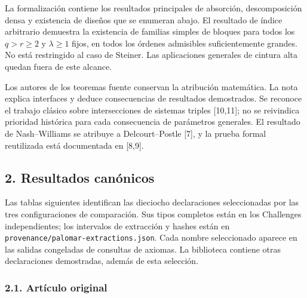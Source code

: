 \documentclass[spanish,11pt,a4paper]{article}
\begin{document}
La formalización contiene los resultados principales de absorción, descomposición densa y existencia de diseños que se enumeran abajo. El resultado de índice arbitrario demuestra la existencia de familias simples de bloques para todos los \(q>r\ge2\) y \(\lambda\ge1\) fijos, en todos los órdenes admisibles suficientemente grandes. No está restringido al caso de Steiner. Las aplicaciones generales de cintura alta quedan fuera de este alcance.

Los autores de los teoremas fuente conservan la atribución matemática. La nota explica interfaces y deduce consecuencias de resultados demostrados. Se reconoce el trabajo clásico sobre intersecciones de sistemas triples {[}10,11{]}; no se reivindica prioridad histórica para cada consecuencia de parámetros generales. El resultado de Nash--Williams se atribuye a Delcourt--Postle {[}7{]}, y la prueba formal reutilizada está documentada en {[}8,9{]}.

\subsection{2. Resultados canónicos}\label{resultados-canuxf3nicos}

Las tablas siguientes identifican las dieciocho declaraciones seleccionadas por las tres configuraciones de comparación. Sus tipos completos están en los Challenges independientes; los intervalos de extracción y hashes están en \texttt{provenance/\allowbreak{}palomar-extractions.\allowbreak{}json}. Cada nombre seleccionado aparece en las salidas congeladas de consultas de axiomas. La biblioteca contiene otras declaraciones demostradas, además de esta selección.


\subsubsection{2.1. Artículo original}\label{artuxedculo-original}
\end{document}
